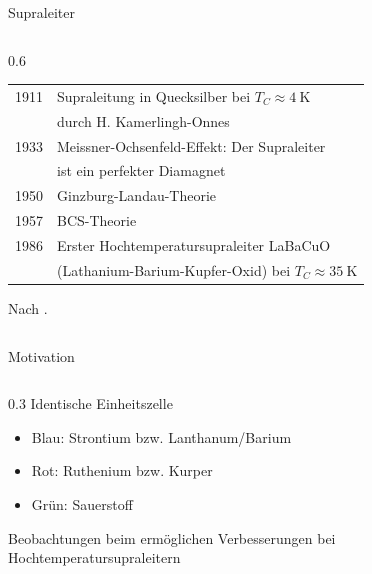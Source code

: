 \begin{frame}{Supraleiter}
    \begin{columns}[t]
        \begin{column}{0.6\linewidth}
            \begin{table}
                \begin{tabular}{ll}
                    1911 & Supraleitung in Quecksilber bei $T_C \approx \SI{4}{\kelvin}$ \\
                    &durch H. Kamerlingh-Onnes \\
                    1933 & Meissner-Ochsenfeld-Effekt: Der Supraleiter \\
                    &ist ein perfekter Diamagnet                 \\
                    1950 & Ginzburg-Landau-Theorie                                                                 \\
                    1957 & BCS-Theorie                                                                             \\
                    1986 & Erster Hochtemperatursupraleiter LaBaCuO \\
                    & (Lathanium-Barium-Kupfer-Oxid) bei $T_C \approx \SI{35}{\kelvin}$
                \end{tabular}
            \end{table}
            Nach \cite{klausslecture}.
        \end{column}
    \end{columns}       
\end{frame}

\begin{frame}{Motivation}
    \begin{columns}
        \begin{column}{0.3\linewidth}
            Identische Einheitszelle
            \begin{itemize}
                \item Blau: Strontium bzw. Lanthanum/Barium
                \item Rot: Ruthenium bzw. Kurper
                \item Grün: Sauerstoff
            \end{itemize}
            Beobachtungen beim  ermöglichen Verbesserungen bei Hochtemperatursupraleitern
        \end{column}
    \end{columns}
\end{frame}

